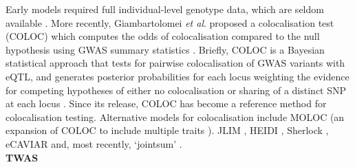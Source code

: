 Early models \cite{plagnol2009statistical, wallace2012statistical, nica2010candidate} required full individual-level genotype data, which are seldom available \cite{cano2020gwas}.
More recently, Giambartolomei \textit{et al}. proposed a  colocalisation test (COLOC) which computes the odds of colocalisation compared to the null hypothesis using GWAS summary statistics \cite{giambartolomei2014bayesian}. 
Briefly, COLOC is a Bayesian statistical approach that tests for pairwise colocalisation of GWAS variants with eQTL, and generates posterior probabilities for each locus weighting the evidence for competing hypotheses of either no colocalisation or sharing of a distinct SNP at each locus \cite{guo2015integration}.
Since its release, COLOC has become a reference method for colocalisation testing. 
Alternative models for colocalisation include 
MOLOC (an expansion of COLOC to include multiple traits \cite{giambartolomei2018bayesian}).
JLIM \cite{chun2017limited}, 
HEIDI \cite{zhu2016integration}, 
Sherlock \cite{he2013sherlock},
eCAVIAR \cite{hormozdiari2016colocalization} 
and, most recently, `jointsum' \cite{deng2020powerful}.\\




\textbf{TWAS}


